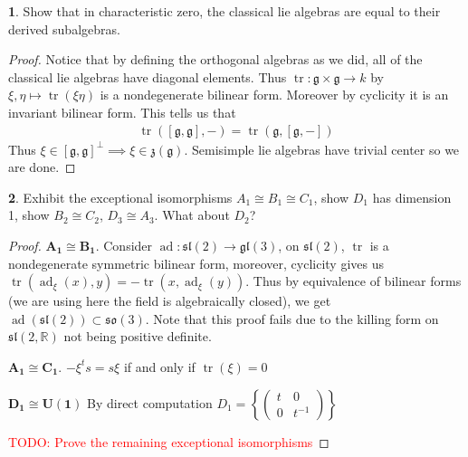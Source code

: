 \documentclass[10.5pt]{article}
\theoremstyle{definition}
\newtheorem{pb}{}
\numberwithin{example}{subsection}
\numberwithin{proposition}{subsection}
\numberwithin{pb}{subsection}
\newcommand{\set}[1]{\left\{#1\right\}}
\begin{document}
        \begin{pb}
            Show that in characteristic zero, the classical lie algebras are equal to their derived subalgebras.

            \begin{proof}
                Notice that by defining the orthogonal algebras as we did, all of the classical lie algebras have diagonal elements. Thus \(\operatorname{tr}: \mathfrak{g} \times \mathfrak{g} \to k\) by \(\xi,\eta \mapsto \operatorname{tr}(\xi \eta)\) is a nondegenerate bilinear form. Moreover by cyclicity it is an invariant bilinear form. This tells us that
                \begin{align}
                    \operatorname{tr}([\mathfrak{g},\mathfrak{g}],-) = \operatorname{tr}(\mathfrak{g},[\mathfrak{g},-])
                \end{align}
                Thus \(\xi \in [\mathfrak{g},\mathfrak{g}]^\perp \implies \xi \in \mathfrak{z}(\mathfrak{g})\). Semisimple lie algebras have trivial center so we are done.
            \end{proof}
        \end{pb}
        \begin{pb}
            Exhibit the exceptional isomorphisms \(A_1 \cong B_1 \cong C_1\), show \(D_1\) has dimension 1, show \(B_2 \cong C_2\), \(D_3 \cong A_3\). What about \(D_2\)?

            \begin{proof}
                \(\mathbf{A_1 \cong B_1.}\) Consider \(\operatorname{ad}: \mathfrak{sl}(2) \to \mathfrak{gl}(3)\), on \(\mathfrak{sl}(2)\), \(\operatorname{tr}\) is a nondegenerate symmetric bilinear form, moreover, cyclicity gives us \(\operatorname{tr}(\operatorname{ad}_\xi(x),y) = -\operatorname{tr}(x,\operatorname{ad}_\xi(y))\). Thus by equivalence of bilinear forms (we are using here the field is algebraically closed), we get \(\operatorname{ad}(\mathfrak{sl}(2)) \subset \mathfrak{so}(3)\). Note that this proof fails due to the killing form on \(\mathfrak{sl}(2,\mathbb{R})\) not being positive definite.

                \(\mathbf{A_1 \cong C_1.}\) \(-\xi^ts = s\xi\) if and only if \(\operatorname{tr}(\xi) = 0\)

                \(\mathbf{D_1 \cong U(1)}\) By direct computation \(D_1 = \set{\begin{pmatrix} t & 0 \\ 0 & t^{-1} \end{pmatrix}}\)

                \textcolor{red}{TODO: Prove the remaining exceptional isomorphisms}
            \end{proof}
        \end{pb}
\end{document}
